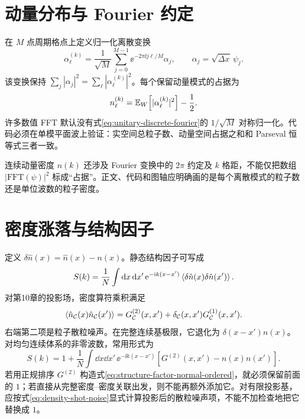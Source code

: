 \section{动量分布与 Fourier 约定}

在 $M$ 点周期格点上定义归一化离散变换
\begin{equation}
  \alpha_\ell^{(k)}=\frac{1}{\sqrt M}
  \sum_{j=0}^{M-1}\ee^{-2\pi\ii j\ell/M}\alpha_j,
  \qquad
  \alpha_j=\sqrt{\Delta x}\,\psi_j.
  \label{eq:unitary-discrete-fourier}
\end{equation}
该变换保持 $\sum_j|\alpha_j|^2=\sum_\ell|\alpha_\ell^{(k)}|^2$。每个保留动量模式的占据为
\begin{equation}
  n_\ell^{(k)}=\mathbb{E}_{W}\!\left[|\alpha_\ell^{(k)}|^2\right]-\frac12.
  \label{eq:momentum-occupation-estimator}
\end{equation}
许多数值 FFT 默认没有式\eqref{eq:unitary-discrete-fourier}的 $1/\sqrt M$ 对称归一化。代码必须在单模平面波上验证：实空间总粒子数、动量空间占据之和和 Parseval 恒等式三者一致。

连续动量密度 $n(k)$ 还涉及 Fourier 变换中的 $2\pi$ 约定及 $k$ 格距，不能仅把数组 $|\mathrm{FFT}(\psi)|^2$ 标成“占据”。正文、代码和图轴应明确画的是每个离散模式的粒子数还是单位波数的粒子密度。

\section{密度涨落与结构因子}

定义 $\delta\hat n(x)=\hat n(x)-n(x)$。静态结构因子可写成
\begin{equation}
  S(k)=\frac{1}{N}\int\mathop{}\!\mathrm{d} x\mathop{}\!\mathrm{d} x'\,
  \mathrm{e}^{-\mathrm{i} k(x-x')}
  \left\langle \delta\hat n(x)\delta\hat n(x')\right\rangle.
  \label{eq:static-structure-factor}
\end{equation}
对第10章的投影场，密度算符乘积满足
\begin{equation}
  \left\langle \hat n_{\mathcal C}(x)\hat n_{\mathcal C}(x')\right\rangle
  =G^{(2)}_{\mathcal C}(x,x')
  +\delta_{\mathcal C}(x,x')G^{(1)}_{\mathcal C}(x,x').
  \label{eq:density-shot-noise}
\end{equation}
右端第二项是粒子散粒噪声。在完整连续基极限，它退化为
$\delta(x-x')n(x)$。对均匀连续体系的非零波数，常用形式为
\begin{equation}
  S(k)=1+\frac{1}{N}\int\dd x\dd x'\,
  \ee^{-\ii k(x-x')}
  \left[G^{(2)}(x,x')-n(x)n(x')\right].
  \label{eq:structure-factor-normal-ordered}
\end{equation}
若用正规排序 $G^{(2)}$ 构造式\eqref{eq:structure-factor-normal-ordered}，就必须保留前面的 $1$；若直接从完整密度--密度关联出发，则不能再额外添加它。对有限投影基，应按式\eqref{eq:density-shot-noise}显式计算投影后的散粒噪声项，不能不加检查地把它替换成 $1$。

